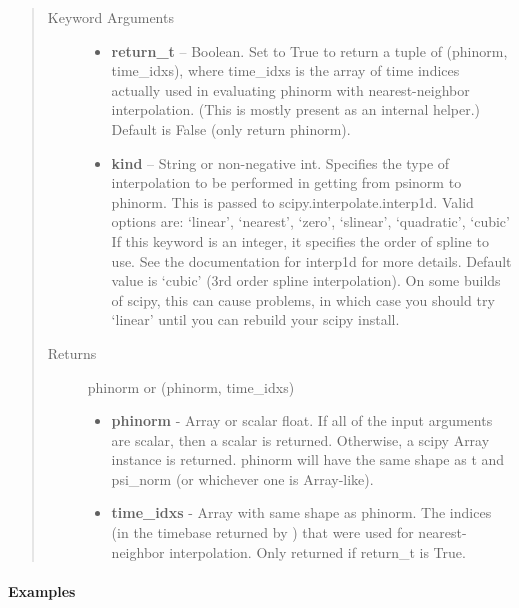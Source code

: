 \documentclass[letterpaper,10pt,english]{sphinxmanual}
\begin{document}
\begin{fulllineitems}
\begin{fulllineitems}
\begin{quote}
\begin{description}
\begin{itemize}
\end{itemize}

\item[{Keyword Arguments}] \leavevmode\begin{itemize}
\item {} 
\textbf{return\_t} --
Boolean. Set to True to return a tuple of (phinorm,
time\_idxs), where time\_idxs is the array of time indices
actually used in evaluating phinorm with nearest-neighbor
interpolation. (This is mostly present as an internal helper.)
Default is False (only return phinorm).

\item {} 
\textbf{kind} --
String or non-negative int. Specifies the type of interpolation
to be performed in getting from psinorm to phinorm. This is
passed to scipy.interpolate.interp1d. Valid options are:
`linear', `nearest', `zero', `slinear', `quadratic', `cubic'
If this keyword is an integer, it specifies the order of spline
to use. See the documentation for interp1d for more details.
Default value is `cubic' (3rd order spline interpolation). On
some builds of scipy, this can cause problems, in which case
you should try `linear' until you can rebuild your scipy install.

\end{itemize}

\item[{Returns}] \leavevmode

phinorm or (phinorm, time\_idxs)
\begin{itemize}
\item {} 
\textbf{phinorm} - Array or scalar float. If all of the input arguments are
scalar, then a scalar is returned. Otherwise, a scipy Array
instance is returned. phinorm will have the same shape as t and
psi\_norm (or whichever one is Array-like).

\item {} 
\textbf{time\_idxs} - Array with same shape as phinorm. The indices (in
the timebase returned by {\hyperref[eqtools:eqtools.core.Equilibrium.getTimeBase]{}}) that were used
for nearest-neighbor interpolation. Only returned if return\_t is
True.

\end{itemize}


\end{description}\end{quote}
\paragraph{Examples}


\end{fulllineitems}
\end{fulllineitems}
\end{document}
